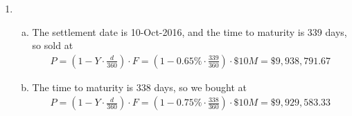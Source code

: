 \documentclass{article}
\begin{document}
\begin{enumerate}
\begin{enumerate}[(a)]
			\item Show that $\alpha$ and $\beta$ can be selected so that the function $t^2+\alpha t+\beta$ has a minimum at $\bar{t}$ and has a value of 1 there. Use these values to conclude that $P''(0)\ge 0.$
				\begin{proof}
					If $f(t)=t^2+\alpha t+\beta,$ then
					\begin{align*}
						f'(t) &= 2t+\alpha = 0 \implies t = -\frac{\alpha}{2}
					\end{align*}
					so we can choose $\alpha$ to be $-2\bar{t},$ so the derivative is 0, and therefore the minimum of the function is at $\bar{t}.$ Then we can choose $\beta$ such that
					\begin{align*}
						f(\bar{t}) &= \bar{t}^2 - 2\bar{t}\cdot \bar{t} + \beta = 1 \implies \beta = \bar{t}^2+1
					\end{align*}
					Thus, the function $f(t)=t^2-2\bar{t}\cdot t + (\bar{t}^2+1)$ has a minimum value of 1 at $t=\bar{t}.$ Now
					\begin{align*}
						P''(0)(1+r)^2 &= \sum_{t}^{}(t^2-2\bar{t}\cdot t + (\bar{t}^2+1)) c_td_t - (\bar{t}^2-2\bar{t}\cdot \bar{t} + (\bar{t}^2+1))d_{\bar{t}} \\
						&\ge \sum_{t}^{} 1\cdot c_td_t - 1\cdot d_{\bar{t}} = P(0) = 0 \\
						\implies P''(0) &\ge 0
					\end{align*}
					as desired.
				\end{proof}

		\end{enumerate}

	\item 
		\begin{enumerate}[(a)]
			\item 
				\begin{soln}
					The settlement date is 10-Oct-2016, and the time to maturity is 339 days, so sold at
					\begin{align*}
						P = \left( 1-Y\cdot \frac{d}{360} \right)\cdot F = \left( 1-0.65\%\cdot \frac{339}{360} \right)\cdot \$10M = \$9, 938, 791.67
					\end{align*}
				\end{soln}

			\item 
				\begin{soln}
					The time to maturity is 338 days, so we bought at
					\begin{align*}
						P = \left( 1-Y\cdot \frac{d}{360} \right)\cdot F = \left( 1-0.75\%\cdot \frac{338}{360} \right)\cdot \$10M = \$9, 929, 583.33
					\end{align*}
				\end{soln}


\end{enumerate}
\end{enumerate}
\end{document}
